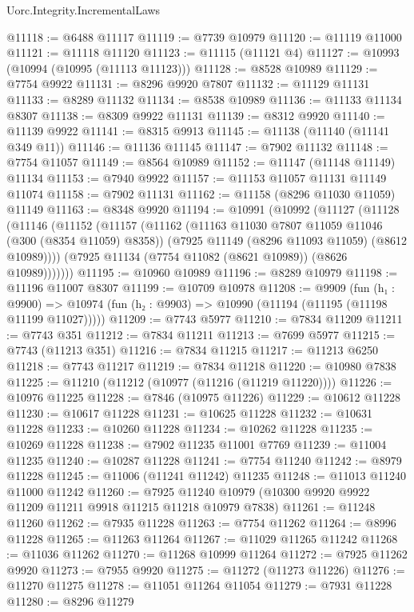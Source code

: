 \begin{lexlean}{Uorc.Integrity.IncrementalLaws}
\begin{coremodule}
@11118 := @6488 @11117
@11119 := @7739 @10979
@11120 := @11119 @11000
@11121 := @11118 @11120
@11123 := @11115 (@11121 @4)
@11127 := @10993 (@10994 (@10995 (@11113 @11123)))
@11128 := @8528 @10989
@11129 := @7754 @9922
@11131 := @8296 @9920 @7807
@11132 := @11129 @11131
@11133 := @8289 @11132
@11134 := @8538 @10989
@11136 := @11133 @11134 @8307
@11138 := @8309 @9922 @11131
@11139 := @8312 @9920
@11140 := @11139 @9922
@11141 := @8315 @9913
@11145 := @11138 (@11140 (@11141 @349 @11))
@11146 := @11136 @11145
@11147 := @7902 @11132
@11148 := @7754 @11057
@11149 := @8564 @10989
@11152 := @11147 (@11148 @11149) @11134
@11153 := @7940 @9922
@11157 := @11153 @11057 @11131 @11149 @11074
@11158 := @7902 @11131
@11162 := @11158 (@8296 @11030 @11059) @11149
@11163 := @8348 @9920
@11194 := @10991
    (@10992
      (@11127
        (@11128
          (@11146
            (@11152
              (@11157
                (@11162
                  (@11163 @11030 @7807 @11059 @11046 (@300 (@8354 @11059) @8358))
                  (@7925 @11149 (@8296 @11093 @11059) (@8612 @10989))))
              (@7925 @11134 (@7754 @11082 (@8621 @10989)) (@8626 @10989)))))))
@11195 := @10960 @10989
@11196 := @8289 @10979
@11198 := @11196 @11007 @8307
@11199 := @10709 @10978
@11208 := @9909
    (fun (h₁ : @9900) =>
    @10974 (fun (h₂ : @9903) => @10990 (@11194 (@11195 (@11198 @11199 @11027)))))
@11209 := @7743 @5977
@11210 := @7834 @11209
@11211 := @7743 @351
@11212 := @7834 @11211
@11213 := @7699 @5977
@11215 := @7743 (@11213 @351)
@11216 := @7834 @11215
@11217 := @11213 @6250
@11218 := @7743 @11217
@11219 := @7834 @11218
@11220 := @10980 @7838
@11225 := @11210 (@11212 (@10977 (@11216 (@11219 @11220))))
@11226 := @10976 @11225
@11228 := @7846 (@10975 @11226)
@11229 := @10612 @11228
@11230 := @10617 @11228
@11231 := @10625 @11228
@11232 := @10631 @11228
@11233 := @10260 @11228
@11234 := @10262 @11228
@11235 := @10269 @11228
@11238 := @7902 @11235 @11001 @7769
@11239 := @11004 @11235
@11240 := @10287 @11228
@11241 := @7754 @11240
@11242 := @8979 @11228
@11245 := @11006 (@11241 @11242) @11235
@11248 := @11013 @11240 @11000 @11242
@11260 := @7925 @11240 @10979 (@10300 @9920 @9922 @11209 @11211 @9918 @11215 @11218 @10979 @7838)
@11261 := @11248 @11260
@11262 := @7935 @11228
@11263 := @7754 @11262
@11264 := @8996 @11228
@11265 := @11263 @11264
@11267 := @11029 @11265 @11242
@11268 := @11036 @11262
@11270 := @11268 @10999 @11264
@11272 := @7925 @11262 @9920
@11273 := @7955 @9920
@11275 := @11272 (@11273 @11226)
@11276 := @11270 @11275
@11278 := @11051 @11264 @11054
@11279 := @7931 @11228
@11280 := @8296 @11279

\end{coremodule}
\end{lexlean}
